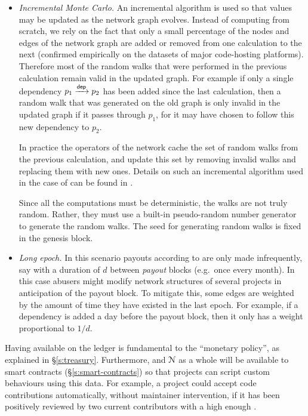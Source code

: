 \begin{itemize}
\item \emph{Incremental Monte Carlo.} An incremental algorithm is used so that
  \osrank{} values may be updated as the network graph evolves. Instead of
  computing \osrank{} from scratch, we rely on the fact that only a small
  percentage of the nodes and edges of the network graph are added or removed
  from one calculation to the next (confirmed empirically on the datasets of
  major code-hosting platforms). Therefore most of the random walks that were
  performed in the previous calculation remain valid in the updated graph. For
  example if only a single dependency $p_1 \xrightarrow[]{\mathsf{dep}} p_2$ has been
  added since the last calculation, then a random walk that was generated on the
  old graph is only invalid in the updated graph if it passes through $p_1$, for
  it may have chosen to follow this new dependency to $p_2$.

  In practice the operators of the network cache the set of random
  walks from the previous calculation, and update this set by removing
  invalid walks and replacing them with new ones. Details on such an
  incremental algorithm used in the case of \pagerank{} can be found
  in \cite{incr pagerank}.

  Since all the computations must be deterministic, the walks are not
  truly random. Rather, they must use a built-in pseudo-random number
  generator to generate the random walks. The seed for generating
  random walks is fixed in the genesis block.


\item \emph{Long epoch.} In this scenario payouts according to
  \osrank{} are only made infrequently, say with a duration of $d$
  between \emph{payout} blocks (e.g.\ once every month). In this case
  abusers might modify network structures of several projects in
  anticipation of the payout block. To mitigate this, some edges are
  weighted by the amount of time they have existed in the last epoch. For
  example, if a dependency is added a day before the payout block,
  then it only has a weight proportional to $1/d$.
\end{itemize}

Having \osrank{} available on the ledger is fundamental to the \oscoin{}
``monetary policy'', as explained in \S \ref{s:treasury}. Furthermore,
\osrank{} and $\mathcal{N}$ as a whole will be available to smart contracts
(\S\ref{s:smart-contracts}) so that projects can script custom behaviours using
this data. For example, a project could accept code contributions
automatically, without maintainer intervention, if it has been positively
reviewed by two current contributors with a high enough \osrank{}.
